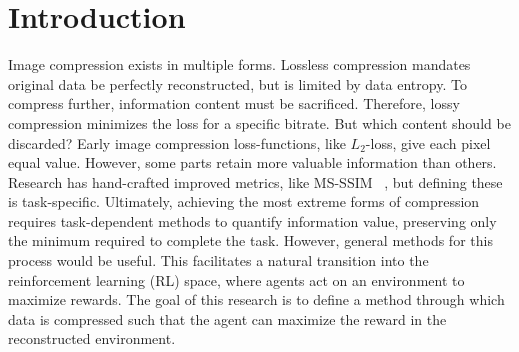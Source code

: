 \section{Introduction}\label{sec:Introduction}
Image compression exists in multiple forms. Lossless compression mandates
original data be perfectly reconstructed, but is limited by data entropy. To
compress further, information content must be sacrificed. Therefore, lossy
compression minimizes the loss for a specific bitrate. But which content should
be discarded? Early image compression loss-functions, like $L_2$-loss, give each
pixel equal value. However, some parts retain more valuable information than
others. Research has hand-crafted improved metrics, like MS-SSIM
~\cite{1292216}, but defining these is task-specific. Ultimately, achieving the
most extreme forms of compression requires task-dependent methods to quantify
information value, preserving only the minimum required to complete the task.
However, general methods for this process would be useful. This facilitates a
natural transition into the reinforcement learning (RL) space, where agents act
on an environment to maximize rewards. The goal of this research is to define a
method through which data is compressed such that the agent can maximize the
reward in the reconstructed environment.
